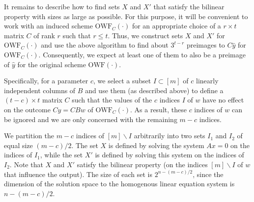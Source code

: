 \documentclass[orivec,envcountsect]{llncs}
\newcommand{\OWF}{\text{OWF}}
\begin{document}
It remains to describe how to find sets $X$ and $X'$ that satisfy the bilinear property with sizes as large as possible.
For this purpose, it will be convenient to work with an induced scheme $\OWF_C(\cdot)$ for an appropriate choice of a $r \times t$ matrix $C$ of rank $r$ such that $r \leq t$.
Thus, we construct sets $X$ and $X'$ for $\OWF_C(\cdot)$ and use the above algorithm to find
about $3^{t - r}$ preimages to $C \hat{y}$ for $\OWF_C(\cdot)$. Consequently, we expect at least one of them to also be a preimage of $\hat{y}$ for the original scheme $\OWF(\cdot)$.

Specifically, for a parameter $c$, we select a subset $I \subset [m]$ of $c$ linearly independent columns of $B$ and use them (as described above) to define a $(t-c) \times t$ matrix $C$ such that the values of the $c$ indices $I$ of $w$ have no effect on the outcome $Cy = CBw$ of $\OWF_C(\cdot)$. As a result, these $c$ indices of $w$ can be ignored and we are only concerned with the remaining $m - c$ indices.

We partition the $m - c$ indices of $[m] \backslash I$ arbitrarily into two sets $I_1$ and $I_2$ of equal size $(m -c)/2$. The set $X$ is defined by solving the system $Ax = 0$ on the indices of $I_1$, while the set $X'$ is defined by solving this system on the indices of $I_2$. Note that $X$ and $X'$ satisfy the bilinear property (on the indices $[m] \backslash I$ of $w$ that influence the output). The size of each set is $2^{n - (m -c)/2}$, since the dimension of the solution space to the homogenous linear equation system is $n - (m -c)/2$.
\end{document}
